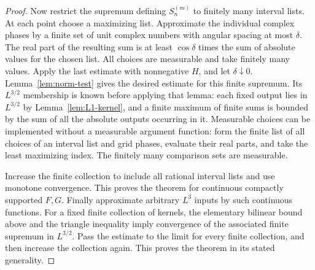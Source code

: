 \documentclass[11pt]{article}
\theoremstyle{remark}\newtheorem{remark}[theorem]{Remark}
\begin{document}
\begin{proof}
Now restrict the supremum defining $S_n^{(m)}$ to finitely many interval lists. At each point choose a maximizing list. Approximate the individual complex phases by a finite set of unit complex numbers with angular spacing at most $\delta$. The real part of the resulting sum is at least $\cos\delta$ times the sum of absolute values for the chosen list. All choices are measurable and take finitely many values. Apply the last estimate with nonnegative $H$, and let $\delta\downarrow0$. Lemma~\ref{lem:norm-test} gives the desired estimate for this finite supremum. Its $L^{3/2}$ membership is known before applying that lemma: each fixed output lies in $L^{3/2}$ by Lemma~\ref{lem:L1-kernel}, and a finite maximum of finite sums is bounded by the sum of all the absolute outputs occurring in it. Measurable choices can be implemented without a measurable argument function: form the finite list of all choices of an interval list and grid phases, evaluate their real parts, and take the least maximizing index. The finitely many comparison sets are measurable.

Increase the finite collection to include all rational interval lists and use monotone convergence. This proves the theorem for continuous compactly supported $F,G$. Finally approximate arbitrary $L^3$ inputs by such continuous functions. For a fixed finite collection of kernels, the elementary bilinear bound above and the triangle inequality imply convergence of the associated finite supremum in $L^{3/2}$. Pass the estimate to the limit for every finite collection, and then increase the collection again. This proves the theorem in its stated generality.
\end{proof}
\end{document}
